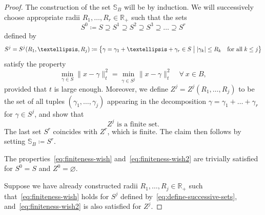 \documentclass[10pt,a4paper]{amsart}
\newcommand{\normsq}[1]{\|#1\|^{2}}
\newcommand{\refnorm}[1]{\lvert#1\rvert}
\newcommand{\R}{\mathbb{R}}
\renewcommand{\S}{\mathbb{S}}
\renewcommand{\emptyset}{\varnothing}
\let\oldforall\forall
\renewcommand*{\forall}{\mathrel{\oldforall}}
\theoremstyle{definition}\newtheorem{defi}[cdrthm]{Definition}
\begin{document}
\begin{proof}
The construction of the set $\S_B$ will be by induction. We will successively choose appropriate radii $R_1, \dots, R_r \in \R_+$ such that the sets
\[
S^0 \coloneqq S\supseteq S^1 \supseteq S^2 \supseteq S^3 \supseteq \dots \supseteq S^{r}
\]
defined by
\begin{equation}\label{eq:define-successive-sets}
S^j = S^j(R_1, \dots, R_j) \coloneqq \bigl\{ \gamma = \gamma_1 + \dots +\gamma_r \in S \bigm|  \refnorm{\gamma_k} \le R_k \quad\text{for all}\; k \le j \bigr\}
\end{equation}
satisfy the property
\begin{equation}\label{eq:finiteness-wish}
\min_{\gamma \in S} \normsq{x -\gamma}_t = \min_{\gamma \in S^j} \normsq{x -\gamma}_t \quad \forall \: x\in B,
\end{equation}
provided that $t$ is large enough. Moreover, we define $Z^j=Z^j(R_1, \dots, R_j)$ to be the set of all tuples $(\gamma_1, \dots, \gamma_j)$ appearing in the decomposition $\gamma =\gamma_1 + \dots +\gamma_r$ for $\gamma \in S^j$, and show that
\begin{equation}\label{eq:finiteness-wish2}
Z^j \text{ is a finite set.}
\end{equation}
The last set $S^r$ coincides with $Z^r$, which is finite. The claim then follows by setting $\S_B \coloneqq S^r$.


The properties~\eqref{eq:finiteness-wish} and~\eqref{eq:finiteness-wish2} are trivially satisfied for $S^0 = S$ and $Z^0 =\emptyset$.

Suppose we have already constructed radii $R_1, \dots, R_j \in \R_+$ such that~\eqref{eq:finiteness-wish} holds for $S^j$ defined by~\eqref{eq:define-successive-sets}, and~\eqref{eq:finiteness-wish2} is also satisfied for $Z^j$.



\end{proof}
\end{document}
